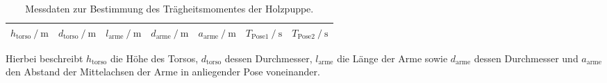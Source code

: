\begin{table}[H]
  \centering
  \caption{Messdaten zur Bestimmung des Trägheitsmomentes der Holzpuppe.}
  \label{tab:mensch2}
  \begin{tabular}{c c c c c c c}
    \toprule
    {$h_\text{torso} \ /\  \si{\metre}$} & {$d_\text{torso} \ /\  \si{\metre}$} & {$l_\text{arme} \ /\  \si{\metre}$} & {$d_\text{arme} \ /\  \si{\metre}$} & {$a_\text{arme} \ /\  \si{\metre}$} & {$T_{\text{Pose1}} \ /\  \si{\second}$} & {$T_{\text{Pose2}} \ /\  \si{\second}$}  \\
    \midrule
    
    \bottomrule
  \end{tabular}
\end{table}

Hierbei beschreibt $h_\text{torso}$ die Höhe des Torsos, $d_\text{torso}$ dessen Durchmesser, $l_\text{arme}$ die Länge der Arme sowie $d_\text{arme}$ dessen Durchmesser und $a_\text{arme}$ den Abstand der Mittelachsen der Arme in anliegender Pose voneinander.

